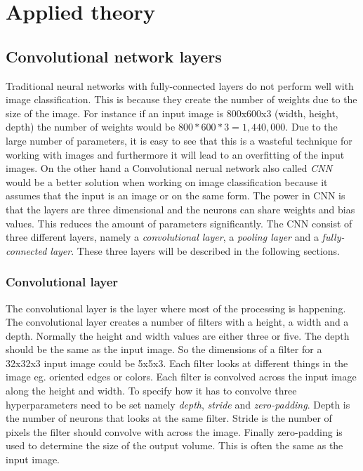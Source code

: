 \chapter{Applied theory}
\label{chp:theory}

\section{Convolutional network layers}
Traditional neural networks with fully-connected layers do not perform well with image classification. This is because they create the number of weights due to the size of the image. For instance if an input image is 800x600x3 (width, height, depth) the number of weights would be $800 * 600 * 3 = 1,440,000$. Due to the large number of parameters, it is easy to see that this is a wasteful technique for working with images and furthermore it will lead to an overfitting of the input images. On the other hand a Convolutional nerual network also called \emph{CNN} would be a better solution when working on image classification because it assumes that the input is an image or on the same form. The power in CNN is that the layers are three dimensional and the neurons can share weights and bias values. This reduces the amount of parameters significantly. The CNN consist of three different layers, namely a \emph{convolutional layer}, a \emph{pooling layer} and a \emph{fully-connected layer}. These three layers will be described in the following sections.

\subsection{Convolutional layer}
The convolutional layer is the layer where most of the processing is happening. The convolutional layer creates a number of filters with a height, a width and a depth. Normally the height and width values are either three or five. The depth should be the same as the input image. So the dimensions of a filter for a 32x32x3 input image could be 5x5x3. Each filter looks at different things in the image eg. oriented edges or colors. Each filter is convolved across the input image along the height and width. To specify how it has to convolve three hyperparameters need to be set namely \emph{depth}, \emph{stride} and \emph{zero-padding}. Depth is the number of neurons that looks at the same filter. Stride is the number of pixels the filter should convolve with across the image. Finally zero-padding is used to determine the size of the output volume. This is often the same as the input image. 

